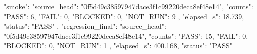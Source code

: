 \begin{codeblock}
{
  "smoke": {
    "source_head": "0f5d49c38597947dace3f1c99220deca8ef48e14",
    "counts": {
      "PASS": 6,
      "FAIL": 0,
      "BLOCKED": 0,
      "NOT_RUN": 9
    },
    "elapsed_s": 18.739,
    "status": "PASS"
  },
  "regression_final": {
    "source_head": "0f5d49c38597947dace3f1c99220deca8ef48e14",
    "counts": {
      "PASS": 15,
      "FAIL": 0,
      "BLOCKED": 0,
      "NOT_RUN": 1
    },
    "elapsed_s": 400.168,
    "status": "PASS"
  }
}
\end{codeblock}
